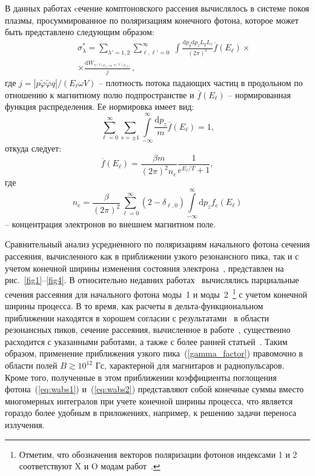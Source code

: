 \documentclass[cp1251%
               ]{jetp} %
\newcommand{\dd}{\mathrm{d}} %
\begin{document}
В данных работах cечение комптоновского рассения вычислялось в системе покоя плазмы, просуммированное по поляризациям конечного фотона, которое может быть представлено следующим образом:
\begin{eqnarray}
\label{eq:sigma}
&&\sigma^*_\lambda = 
\sum\limits_{\lambda'=1, 2} 
\sum\limits_{\ell, \ell' = 0}^{\infty} \; \int  \frac{\dd p_y \dd p_z L_y L_z}{(2\pi)^2} \overline{f}(E_\ell) 
\times 
\\
\nonumber
&&\times 
\frac{\dd W_{\gamma^{(\lambda)} e_\ell \to \gamma^{(\lambda')} e_{\ell'}}}{j}\, ,
\end{eqnarray}
где $j=|p\tilde\varphi\tilde\varphi q|/(E_\ell \omega V)$ -- плотность потока падающих частиц в продольном по отношению к магнитному полю подпространстве и $\overline{f}(E_\ell)$ -- нормированная функция распределения. Ее нормировка имеет вид:
\begin{equation}
\sum\limits_{\ell = 0}^{\infty}
\sum\limits_{s=\pm 1} 
\int \limits_{-\infty}^{\infty} \frac{\dd p_z}{m} \overline{f}(E_\ell)=1,
\end{equation}
откуда следует:
\begin{equation}
	\overline{f}(E_\ell)=\frac{\beta m}{(2\pi)^2n_e}\frac{1}{e^{E_\ell/T}+1},
\end{equation}
где 
\begin{equation}\label{eq:ne}
	n_e = \frac{\beta}{(2 \pi)^2} \sum \limits^{\infty}_{\ell=0} 
	(2-\delta_{\ell,0}) \int \limits^{\infty}_{-\infty}\dd p_z f_{e}(E_{\ell})
\end{equation}
-- концентрация электронов во внешнем магнитном поле.

Сравнительный анализ усредненного по поляризациям начального фотона сечения 
рассеяния, вычисленного как в приближении узкого резонансного пика, так и с 
учетом конечной ширины изменения состояния электрона~\cite{Harding:1991,SchwarmD:2017}, представлен на 
рис.~\ref{fig1}--\ref{fig4}. В относительно недавних работах~\cite{Mushtukov:2016,SchwarmD:2017} вычислялись 
парциальные сечения рассеяния для начального фотона моды~1 и моды~2~\footnote{Отметим, что обозначения векторов поляризации фотонов индексами 1 и 2 соответствуют X и O модам работ~\cite{Mushtukov:2016,SchwarmD:2017}.} с учетом 
конечной ширины процесса. В то время, как расчеты в дельта-функциональном 
приближении находятся в хорошем согласии с 
результатами~\cite{Harding:1991,SchwarmD:2017} в области резонансных пиков, 
сечение рассеяния, вычисленное в работе~\cite{Mushtukov:2016}, существенно 
расходится с указанными работами, а также с более ранней статьей~\cite{Mushtukov:2015}. Таким образом, применение 
приближения узкого пика~(\ref{gamma_factor}) правомочно  в области полей $B \gtrsim 10^{12}$ Гс, характерной для магнитаров и радиопульсаров. Кроме того, 
полученные в этом приближении коэффициенты поглощения фотона~(\ref{eq:wabs1}) 
и~(\ref{eq:wabs2}) представляют собой конечные суммы вместо многомерных интегралов при учете 
конечной ширины процесса, что является гораздо более 
удобным в приложениях, например, к решению задачи переноса излучения.
\end{document}
